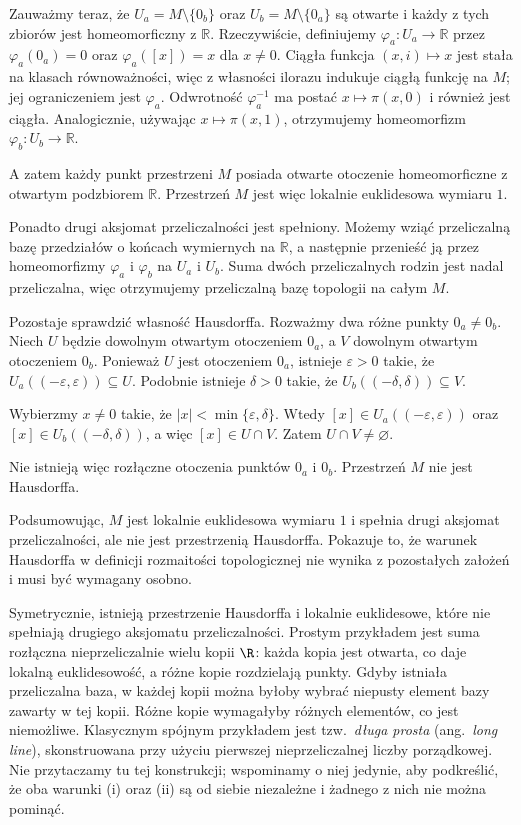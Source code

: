 \begin{przyklad}
Zauważmy teraz, że $U_a=M\setminus\{0_b\}$ oraz $U_b=M\setminus\{0_a\}$ są otwarte i każdy z tych zbiorów jest homeomorficzny z $\mathbb{R}$. Rzeczywiście, definiujemy $\varphi_a\colon U_a\to\mathbb{R}$ przez $\varphi_a(0_a)=0$ oraz $\varphi_a([x])=x$ dla $x\neq0$. Ciągła funkcja $(x,i)\mapsto x$ jest stała na klasach równoważności,
więc z własności ilorazu indukuje ciągłą funkcję na $M$;
jej ograniczeniem jest $\varphi_a$. Odwrotność $\varphi_a^{-1}$ ma postać
$x\mapsto\pi(x,0)$ i również jest ciągła. Analogicznie, używając
$x\mapsto\pi(x,1)$, otrzymujemy homeomorfizm
$\varphi_b\colon U_b\to\mathbb{R}$.

A zatem każdy punkt przestrzeni $M$ posiada otwarte otoczenie homeomorficzne z otwartym podzbiorem $\mathbb{R}$. Przestrzeń $M$ jest więc lokalnie euklidesowa wymiaru $1$.

Ponadto drugi aksjomat przeliczalności jest spełniony. Możemy wziąć przeliczalną bazę przedziałów o końcach wymiernych na $\mathbb{R}$, a następnie przenieść ją przez homeomorfizmy $\varphi_a$ i $\varphi_b$ na $U_a$ i $U_b$. Suma dwóch przeliczalnych rodzin jest nadal przeliczalna, więc otrzymujemy przeliczalną bazę topologii na całym $M$.

Pozostaje sprawdzić własność Hausdorffa. Rozważmy dwa różne punkty $0_a\neq0_b$. Niech $U$ będzie dowolnym otwartym otoczeniem $0_a$, a $V$ dowolnym otwartym otoczeniem $0_b$. Ponieważ $U$ jest otoczeniem $0_a$, istnieje $\varepsilon>0$ takie, że $U_a((-\varepsilon,\varepsilon))\subseteq U$. Podobnie istnieje $\delta>0$ takie, że $U_b((-\delta,\delta))\subseteq V$.

Wybierzmy $x\neq0$ takie, że $|x|<\min\{\varepsilon,\delta\}$. Wtedy $[x]\in U_a((-\varepsilon,\varepsilon))$ oraz $[x]\in U_b((-\delta,\delta))$, a więc $[x]\in U\cap V$. Zatem $U\cap V\neq\varnothing$.

Nie istnieją więc rozłączne otoczenia punktów $0_a$ i $0_b$. Przestrzeń $M$ nie jest Hausdorffa.

Podsumowując, $M$ jest lokalnie euklidesowa wymiaru $1$ i spełnia drugi aksjomat przeliczalności, ale nie jest przestrzenią Hausdorffa. Pokazuje to, że warunek Hausdorffa w definicji rozmaitości topologicznej nie wynika z pozostałych założeń i musi być wymagany osobno.
\end{przyklad}

\begin{uwaga}
Symetrycznie, istnieją przestrzenie Hausdorffa i lokalnie euklidesowe, które nie spełniają
drugiego aksjomatu przeliczalności. Prostym przykładem jest suma
rozłączna nieprzeliczalnie wielu kopii $\R$: każda kopia jest otwarta,
co daje lokalną euklidesowość, a różne kopie rozdzielają punkty.
Gdyby istniała przeliczalna baza, w każdej kopii można byłoby wybrać
niepusty element bazy zawarty w tej kopii. Różne kopie wymagałyby
różnych elementów, co jest niemożliwe.
Klasycznym spójnym przykładem jest tzw.\ \emph{długa prosta}
(ang.\ \emph{long line}), skonstruowana przy użyciu pierwszej nieprzeliczalnej liczby
porządkowej. Nie przytaczamy tu tej konstrukcji; wspominamy o niej jedynie, aby podkreślić,
że oba warunki (i) oraz (ii) są od siebie niezależne i żadnego z nich nie można pominąć.
\end{uwaga}

